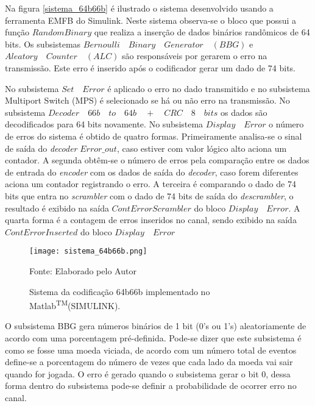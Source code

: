 Na figura \autoref{sistema_64b66b} é ilustrado o sistema desenvolvido usando a ferramenta EMFB do Simulink. Neste sistema observa-se o bloco que possui a função $RandomBinary$ que realiza a inserção de dados binários randômicos de 64 bits. Os subsistemas $Bernoulli \quad Binary \quad Generator \quad (BBG)$ e $Aleatory \quad Counter \quad (ALC)$ são responsáveis por gerarem o erro na transmissão. Este erro é inserido após o codificador gerar um dado de 74 bits. 

No subsistema $Set \quad Error$ é aplicado o erro no dado transmitido e no subsistema Multiport Switch (MPS) é selecionado se há ou não erro na transmissão. No subsistema $Decoder \quad 66b \quad to \quad 64b \quad + \quad CRC \quad 8 \quad bits$  os dados são decodificados para 64 bits novamente. No subsistema $Display \quad Error$ o número de erros do sistema é obtido de quatro formas. Primeiramente analisa-se o sinal de saída do \textit{decoder} $Error\_out$,  caso estiver com valor lógico alto aciona um contador. A segunda obtêm-se o número de erros pela comparação entre os dados de entrada do \textit{encoder} com os dados de saída do \textit{decoder}, caso forem diferentes aciona um contador registrando o erro. A terceira é comparando o dado de 74 bits que entra no \textit{scrambler} com o dado de 74 bits de saída do \textit{descrambler}, o resultado é exibido na saída $ContErrorScrambler$ do bloco $Display \quad Error$. A quarta forma é a contagem de erros inseridos no canal, sendo exibido na saída $ContErrorInserted$ do bloco $Display \quad Error$  

\begin{figure}[H]
	\caption{\label{sistema_64b66b} Sistema da codificação 64b66b implementado no Matlab\textsuperscript{TM}(SIMULINK).}
	\centering
	\texttt{[image: sistema\_64b66b.png]}
	\begin{center}
		Fonte: Elaborado pelo Autor
	\end{center}	
\end{figure}

O subsistema BBG gera números binários de 1 bit (0’s ou 1’s) aleatoriamente de acordo com uma porcentagem pré-definida. Pode-se dizer que este subsistema é como se fosse uma moeda viciada, de acordo com um número total de eventos define-se a porcentagem do número de vezes que cada lado da moeda vai sair quando for jogada. O erro é gerado quando o subsistema gerar o bit 0, dessa forma dentro do subsistema pode-se definir a probabilidade de ocorrer erro no canal.

